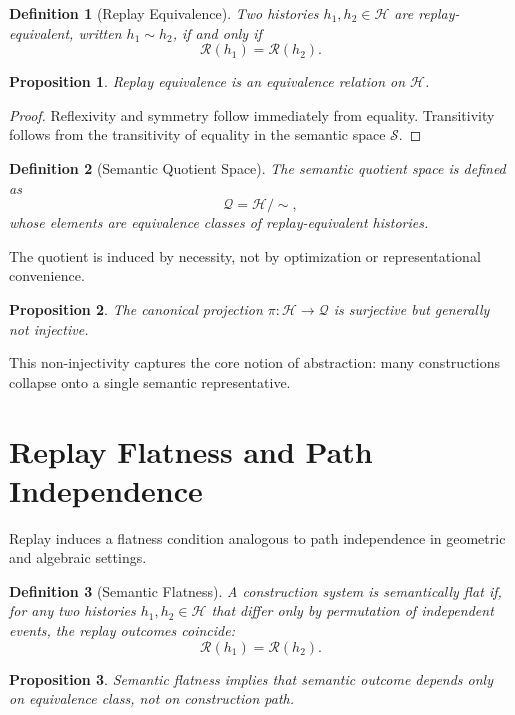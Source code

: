 \documentclass[11pt]{article}
\newtheorem{definition}{Definition}[section]
\newtheorem{proposition}{Proposition}[section]
\begin{document}
\begin{definition}[Replay Equivalence]
Two histories $h_1, h_2 \in \mathcal{H}$ are replay-equivalent, written $h_1 \sim h_2$, if and only if
\[
\mathcal{R}(h_1) = \mathcal{R}(h_2).
\]
\end{definition}

\begin{proposition}
Replay equivalence is an equivalence relation on $\mathcal{H}$.
\end{proposition}

\begin{proof}
Reflexivity and symmetry follow immediately from equality. Transitivity follows from the transitivity of equality in the semantic space $\mathcal{S}$.
\end{proof}

\begin{definition}[Semantic Quotient Space]
The semantic quotient space is defined as
\[
\mathcal{Q} = \mathcal{H} / \sim,
\]
whose elements are equivalence classes of replay-equivalent histories.
\end{definition}

The quotient is induced by necessity, not by optimization or representational convenience.

\begin{proposition}
The canonical projection $\pi : \mathcal{H} \to \mathcal{Q}$ is surjective but generally not injective.
\end{proposition}

This non-injectivity captures the core notion of abstraction: many constructions collapse onto a single semantic representative.

\section{Replay Flatness and Path Independence}

Replay induces a flatness condition analogous to path independence in geometric and algebraic settings.

\begin{definition}[Semantic Flatness]
A construction system is semantically flat if, for any two histories $h_1, h_2 \in \mathcal{H}$ that differ only by permutation of independent events, the replay outcomes coincide:
\[
\mathcal{R}(h_1) = \mathcal{R}(h_2).
\]
\end{definition}

\begin{proposition}
Semantic flatness implies that semantic outcome depends only on equivalence class, not on construction path.
\end{proposition}
\end{document}
